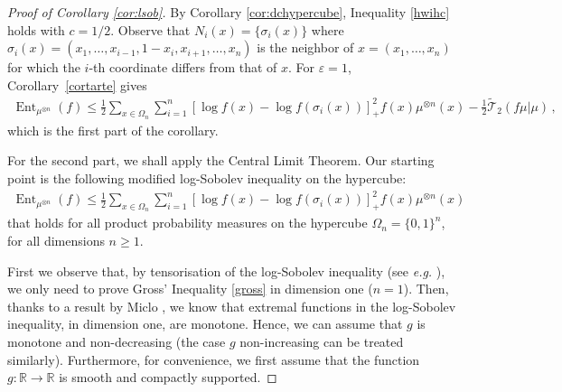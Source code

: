 \documentclass[11pt]{amsart}
\numberwithin{equation}{section}
\begin{document}
\begin{proof}[Proof of Corollary \ref{cor:lsob}]
By Corollary \ref{cor:dchypercube}, 
Inequality \eqref{hwihc} holds with $c=1/2$. Observe that $N_i(x)=\{\sigma_i(x)\}$ where 
$\sigma_i(x)=(x_1,\dots,x_{i-1},1-x_i,x_{i+1},\dots,x_n)$ is the neighbor of $x=(x_1,\dots,x_n)$ for which the $ i$-th coordinate differs from that of $x$. For ${\varepsilon}=1$, Corollary~\ref{cortarte} gives 
\begin{eqnarray*}
{\operatorname{Ent}}_{\mu^{\otimes n}}(f)\leq \frac{1}{2} \sum_{x\in \Omega_n} \sum_{i=1}^n  \left[ \log  f(x) - \log f(\sigma_i(x))  \right]_{+}^2f(x)\mu^{\otimes n}(x) -  \frac{1}{2} {\widetilde{\mathcal{T}}}_2(f\mu|\mu)\,,
\end{eqnarray*}
which is the first part of the corollary. 

For the second part, we shall apply the Central Limit Theorem. Our starting point is the 
following modified log-Sobolev inequality on the hypercube:
\begin{eqnarray}\label{mod+logsob}
{\operatorname{Ent}}_{\mu^{\otimes n}}(f)\leq  \frac{1}{2} \sum_{x\in \Omega_n} \sum_{i=1}^n  \left[ \log  f(x) - \log f(\sigma_i(x))  \right]_{+}^2f(x)\mu^{\otimes n}(x) 
\end{eqnarray}
that holds for all product probability measures on the hypercube $\Omega_n=\{0,1\}^n$, for all dimensions $n\ge 1$. 

First we observe that, by tensorisation of the log-Sobolev inequality (see \textit{e.g.} \cite[Chapter 1]{ane}), we only need to prove 
Gross' Inequality \eqref{gross} in dimension one ($n=1$). Then, thanks to a result by Miclo \cite{miclo}, we know that extremal functions in the log-Sobolev inequality, in dimension one, are monotone. Hence, we can assume that $g$ is monotone and non-decreasing (the case $g$ non-increasing can be treated similarly). Furthermore, for convenience, we first assume that the function 
$g \colon \mathbb{R} \to \mathbb{R}$ is smooth and compactly supported.  


\end{proof}
\end{document}
